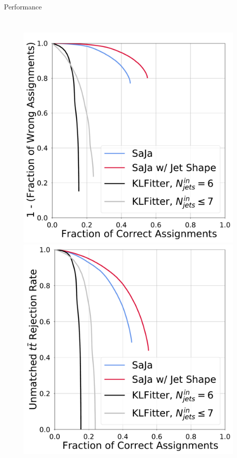 \begin{frame}[fragile]{Performance}
\begin{columns}
      \begin{figure}
        \centering
        \includegraphics[width=\textwidth]{fig/roc/roc_wrong-rej_vs_correct.pdf}
        \includegraphics[width=\textwidth]{fig/roc/roc_unmathed-rej_vs_correct.pdf}

\end{figure}
\end{columns}
\end{frame}

